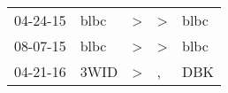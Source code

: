 \begin{supertabular}{lllll}
 04-24-15 &  blbc &  \textgreater &  \textgreater &  blbc \\
 08-07-15 &  blbc &  \textgreater &  \textgreater &  blbc \\
 04-21-16 &  3WID &  \textgreater &             , &   DBK \\
\end{supertabular}
